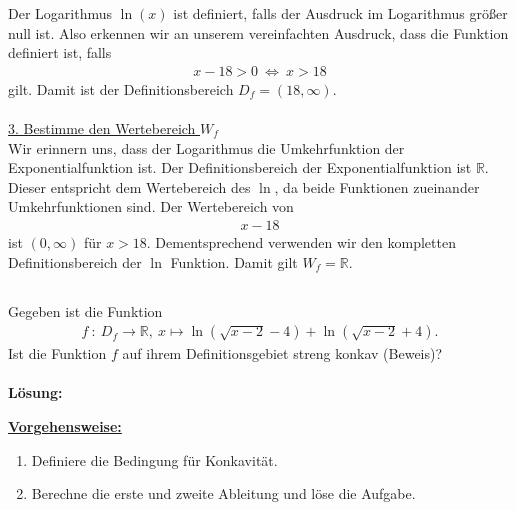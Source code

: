 Der Logarithmus $ \ln(x) $ ist definiert, falls der Ausdruck im Logarithmus größer null ist.
Also erkennen  wir an unserem vereinfachten Ausdruck, dass die Funktion definiert ist, falls
\begin{align*}
x - 18 > 0 \ \Leftrightarrow \ x > 18
\end{align*}
gilt. Damit ist der Definitionsbereich $ D_f = (18,\infty) $.
\\
\\
\underline{3. Bestimme den Wertebereich $ W_f $}\\
Wir erinnern uns, dass der Logarithmus die Umkehrfunktion der Exponentialfunktion ist.
Der Definitionsbereich der Exponentialfunktion ist $ \mathbb{R} $. Dieser entspricht dem Wertebereich des $ \ln $, da beide Funktionen zueinander Umkehrfunktionen sind.
Der Wertebereich von 
\begin{align*}
x - 18 
\end{align*}
ist $ (0, \infty) $ für $ x > 18 $. Dementsprechend verwenden wir den kompletten Definitionsbereich der $ \ln $ Funktion.
Damit gilt $ W_f = \mathbb{R} $.

\newpage

\subsection*{}
Gegeben ist die Funktion 
\begin{align*}
f  \ : \ D_f \to \mathbb{R},
\
x \mapsto \ln(\sqrt{x-2} - 4 ) + \ln(\sqrt{x-2} + 4).
\end{align*}
Ist die Funktion $ f  $ auf ihrem Definitionsgebiet streng konkav (Beweis)?
\\
\\
\textbf{Lösung:}
\begin{mdframed}
\underline{\textbf{Vorgehensweise:}}
\renewcommand{\labelenumi}{\theenumi.}
\begin{enumerate}
\item Definiere die Bedingung für Konkavität.
\item Berechne die erste und zweite Ableitung und löse die Aufgabe.
\end{enumerate}
\end{mdframed}

